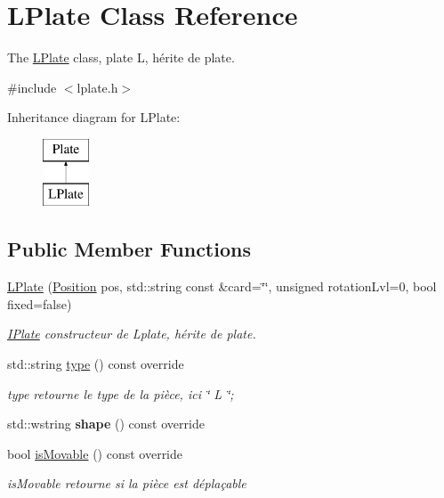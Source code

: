 \hypertarget{class_l_plate}{}\section{L\+Plate Class Reference}
\label{class_l_plate}


The \mbox{\hyperlink{class_l_plate}{L\+Plate}} class, plate L, hérite de plate.  




{\ttfamily \#include $<$lplate.\+h$>$}

Inheritance diagram for L\+Plate\+:\begin{figure}[H]
\begin{center}
\leavevmode
\includegraphics[height=2.000000cm]{class_l_plate}
\end{center}
\end{figure}
\subsection*{Public Member Functions}
\begin{DoxyCompactItemize}
\item 
\mbox{\hyperlink{class_l_plate_a6b4eebfd74b3a2b5e0fec88619c50a11}{L\+Plate}} (\mbox{\hyperlink{class_position}{Position}} pos, std\+::string const \&card=\char`\"{}\char`\"{}, unsigned rotation\+Lvl=0, bool fixed=false)
\begin{DoxyCompactList}\small\item\em \mbox{\hyperlink{class_i_plate}{I\+Plate}} constructeur de Lplate, hérite de plate. \end{DoxyCompactList}\item 
std\+::string \mbox{\hyperlink{class_l_plate_a2714a969bb1eb66592a685b7f9f4de99}{type}} () const override
\begin{DoxyCompactList}\small\item\em type retourne le type de la pièce, ici \char`\"{} L \char`\"{}; \end{DoxyCompactList}\item 
\mbox{\label{class_l_plate_af4cc734d2490aa6c61472f68645f9374}} 
std\+::wstring {\bfseries shape} () const override
\item 
bool \mbox{\hyperlink{class_l_plate_ade5e8a7ead0c0eae0cbdb2a15aa6f32a}{is\+Movable}} () const override
\begin{DoxyCompactList}\small\item\em is\+Movable retourne si la pièce est déplaçable \end{DoxyCompactList}\end{DoxyCompactItemize}
